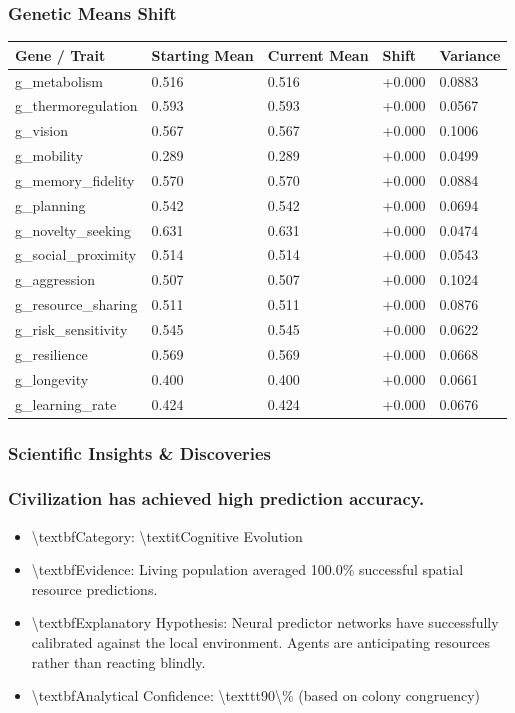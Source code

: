 \documentclass[11pt,a4paper]{article}
\begin{document}
\subsubsection*{ Genetic Means Shift}
\begin{longtable}{lllll}
\toprule
Gene / Trait & Starting Mean & Current Mean & Shift & Variance \\
\midrule
\endhead
g\_metabolism & 0.516 & 0.516 & +0.000 & 0.0883 \\
g\_thermoregulation & 0.593 & 0.593 & +0.000 & 0.0567 \\
g\_vision & 0.567 & 0.567 & +0.000 & 0.1006 \\
g\_mobility & 0.289 & 0.289 & +0.000 & 0.0499 \\
g\_memory\_fidelity & 0.570 & 0.570 & +0.000 & 0.0884 \\
g\_planning & 0.542 & 0.542 & +0.000 & 0.0694 \\
g\_novelty\_seeking & 0.631 & 0.631 & +0.000 & 0.0474 \\
g\_social\_proximity & 0.514 & 0.514 & +0.000 & 0.0543 \\
g\_aggression & 0.507 & 0.507 & +0.000 & 0.1024 \\
g\_resource\_sharing & 0.511 & 0.511 & +0.000 & 0.0876 \\
g\_risk\_sensitivity & 0.545 & 0.545 & +0.000 & 0.0622 \\
g\_resilience & 0.569 & 0.569 & +0.000 & 0.0668 \\
g\_longevity & 0.400 & 0.400 & +0.000 & 0.0661 \\
g\_learning\_rate & 0.424 & 0.424 & +0.000 & 0.0676 \\
\bottomrule
\end{longtable}

\subsubsection*{ Scientific Insights \& Discoveries}
\subsubsection*{ Civilization has achieved high prediction accuracy.}
\begin{itemize}
  \item \textbackslash{}textbf{Category:} \textbackslash{}textit{Cognitive Evolution}
  \item \textbackslash{}textbf{Evidence:} Living population averaged 100.0\% successful spatial resource predictions.
  \item \textbackslash{}textbf{Explanatory Hypothesis:} Neural predictor networks have successfully calibrated against the local environment. Agents are anticipating resources rather than reacting blindly.
  \item \textbackslash{}textbf{Analytical Confidence:} \textbackslash{}texttt{90\textbackslash{}\%} (based on colony congruency)
\end{itemize}
\end{document}
